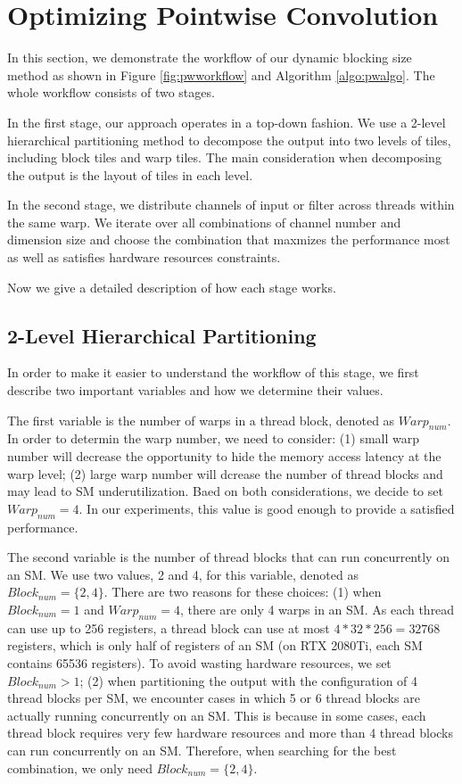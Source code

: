 \section{Optimizing Pointwise Convolution}
\label{sec:pwconv}
In this section, we demonstrate the workflow of our dynamic blocking size method as shown in Figure \ref{fig:pwworkflow} and Algorithm \ref{algo:pwalgo}. 
The whole workflow consists of two stages. 

In the first stage, our approach operates in a top-down fashion. 
We use a 2-level hierarchical partitioning method to decompose the output into two levels of tiles, including block tiles and warp tiles. 
The main consideration when decomposing the output is the layout of tiles in each level.

In the second stage, we distribute channels of input or filter across threads within the same warp.
We iterate over all combinations of channel number and dimension size and choose the combination that maxmizes the performance most as well as satisfies hardware resources constraints.

Now we give a detailed description of how each stage works.
\subsection{2-Level Hierarchical Partitioning}
In order to make it easier to understand the workflow of this stage, we first describe two important variables and how we determine their values.

The first variable is the number of warps in a thread block, denoted as $Warp_{num}$.
In order to determin the warp number, we need to consider: (1) small warp number will decrease the opportunity to hide the memory access latency at the warp level;
(2) large warp number will dcrease the number of thread blocks and may lead to SM underutilization.
Baed on both considerations, we decide to set $Warp_{num}=4$.
In our experiments, this value is good enough to provide a satisfied performance.

The second variable is the number of thread blocks that can run concurrently on an SM.
We use two values, 2 and 4, for this variable, denoted as $Block_{num}=\{2, 4\}$. 
There are two reasons for these choices: 
(1) when $Block_{num}=1$ and $Warp_{num}=4$, there are only 4 warps in an SM. 
As each thread can use up to 256 registers, a thread block can use at most $4*32*256=32768$ registers, which is only half of registers of an SM (on RTX 2080Ti, each SM contains 65536 registers).
To avoid wasting hardware resources, we set $Block_{num}>1$; 
(2) when partitioning the output with the configuration of 4 thread blocks per SM, we encounter cases in which 5 or 6 thread blocks are actually running concurrently on an SM. 
This is because in some cases, each thread block requires very few hardware resources and more than 4 thread blocks can run concurrently on an SM.
Therefore, when searching for the best combination, we only need $Block_{num}=\{2,4\}$.

